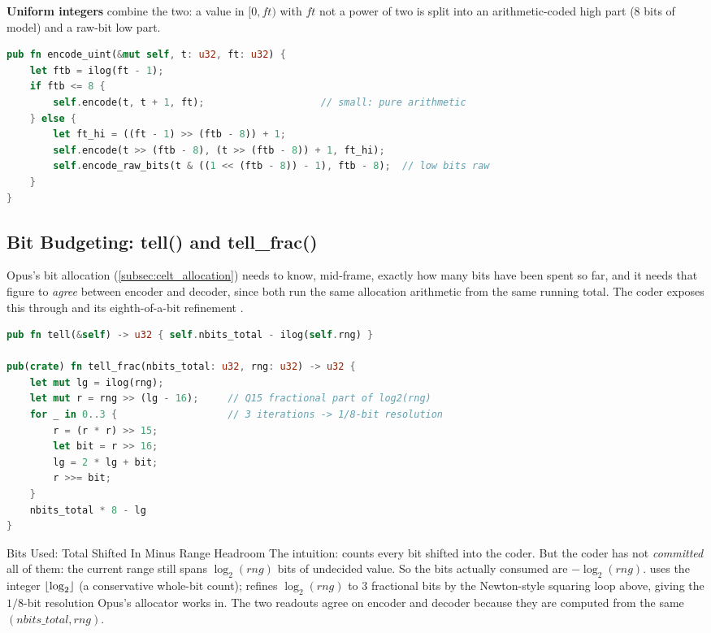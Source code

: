 \textbf{Uniform integers} combine the two: a value in $[0, \mathit{ft})$ with
$\mathit{ft}$ not a power of two is split into an arithmetic-coded high part
(8 bits of model) and a raw-bit low part.

\begin{lstlisting}[language=Rust]
pub fn encode_uint(&mut self, t: u32, ft: u32) {
    let ftb = ilog(ft - 1);
    if ftb <= 8 {
        self.encode(t, t + 1, ft);                    // small: pure arithmetic
    } else {
        let ft_hi = ((ft - 1) >> (ftb - 8)) + 1;
        self.encode(t >> (ftb - 8), (t >> (ftb - 8)) + 1, ft_hi);
        self.encode_raw_bits(t & ((1 << (ftb - 8)) - 1), ftb - 8);  // low bits raw
    }
}
\end{lstlisting}

\subsection{Bit Budgeting: tell() and tell\_frac()}\label{subsec:tell}

Opus's bit allocation (\cref{subsec:celt_allocation}) needs to know, mid-frame,
exactly how many bits have been spent so far, and it needs that figure to
\emph{agree} between encoder and decoder, since both run the same allocation
arithmetic from the same running total. The coder exposes this through
 and its eighth-of-a-bit refinement .

\begin{lstlisting}[language=Rust]
pub fn tell(&self) -> u32 { self.nbits_total - ilog(self.rng) }

pub(crate) fn tell_frac(nbits_total: u32, rng: u32) -> u32 {
    let mut lg = ilog(rng);
    let mut r = rng >> (lg - 16);     // Q15 fractional part of log2(rng)
    for _ in 0..3 {                   // 3 iterations -> 1/8-bit resolution
        r = (r * r) >> 15;
        let bit = r >> 16;
        lg = 2 * lg + bit;
        r >>= bit;
    }
    nbits_total * 8 - lg
}
\end{lstlisting}

\begin{concept}{Bits Used: Total Shifted In Minus Range Headroom}
  The intuition:  counts every bit shifted into the coder.
  But the coder has not \emph{committed} all of them: the current range
   still spans $\log_2(\mathit{rng})$ bits of undecided value. So the
  bits actually consumed are  $- \log_2(\mathit{rng})$.
   uses the integer $\floor*{\log_2}$ (a conservative whole-bit
  count);  refines $\log_2(\mathit{rng})$ to 3
  fractional bits
  by the Newton-style squaring loop above, giving the $1/8$-bit
  resolution Opus's
  allocator works in. The two readouts agree on encoder and decoder because they
  are computed from the same $(\mathit{nbits\_total}, \mathit{rng})$.
\end{concept}

